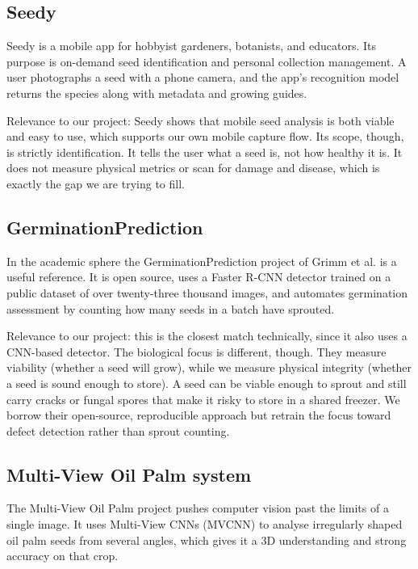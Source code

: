 \subsection{Seedy}

Seedy \cite{seedy2026app} is a mobile app for hobbyist gardeners, botanists, and
educators. Its purpose is on-demand seed identification and personal collection
management. A user photographs a seed with a phone camera, and the app's
recognition model returns the species along with metadata and growing guides.

Relevance to our project: Seedy shows that mobile seed analysis is both viable
and easy to use, which supports our own mobile capture flow. Its scope, though,
is strictly identification. It tells the user what a seed is, not how healthy it
is. It does not measure physical metrics or scan for damage and disease, which
is exactly the gap we are trying to fill.

\subsection{GerminationPrediction}

In the academic sphere the GerminationPrediction project of Grimm et al.
\cite{grimm2024germination} is a useful reference. It is open source, uses a
Faster R-CNN detector trained on a public dataset of over twenty-three thousand
images, and automates germination assessment by counting how many seeds in a
batch have sprouted.

Relevance to our project: this is the closest match technically, since it also
uses a CNN-based detector. The biological focus is different, though. They
measure viability (whether a seed will grow), while we measure physical
integrity (whether a seed is sound enough to store). A seed can be viable enough
to sprout and still carry cracks or fungal spores that make it risky to store in
a shared freezer. We borrow their open-source, reproducible approach but retrain
the focus toward defect detection rather than sprout counting.

\subsection{Multi-View Oil Palm system}

The Multi-View Oil Palm project \cite{oilpalmmvcnn} pushes computer vision past
the limits of a single image. It uses Multi-View CNNs (MVCNN) to analyse
irregularly shaped oil palm seeds from several angles, which gives it a 3D
understanding and strong accuracy on that crop.

